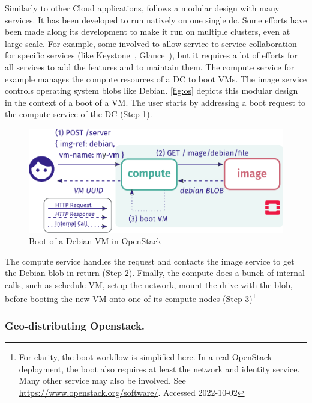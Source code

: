 Similarly to other Cloud applications, \os follows a modular design
with many services.
%
It has been developed to run natively on one single \gls{dc}.
%
Some efforts have been made along its development to make it run on
multiple clusters, even at large scale.
%
For example, some involved to allow service-to-service collaboration
for specific services (like Keystone~\cite{keystonefed},
Glance~\cite{glance-edge}), but it requires a lot of efforts for all
services to add the features and to maintain them.
%
The compute service for example manages the compute resources of a
\acrshort{DC} to boot VMs.
%
The image service controls operating system \acrshort{blob}s like Debian.
\autoref{fig:os} depicts this modular design in the context of a boot
of a VM.
%
The user starts by addressing a boot request to the compute
service of the DC (Step 1).
%
\begin{figure}[h]
  \centering
  \includegraphics[width=.7\linewidth]{figs/pdf/openstack-vmprovision}
  \caption{Boot of a Debian VM in OpenStack}
  \label{fig:os}
\end{figure}
%
The compute service handles the request and contacts the image service
to get the Debian blob in return (Step 2).
%
Finally, the compute does a bunch of internal calls, such as schedule
VM, setup the network, mount the drive with the blob, before booting
the new VM onto one of its compute nodes (Step 3)\footnote{For
clarity, the boot workflow is simplified here. In a real OpenStack
deployment, the boot also requires at least the network and identity
service. Many other service may also be involved.  See
\url{https://www.openstack.org/software/}.  Accessed 2022-10-02}


\subsubsection{Geo-distributing Openstack.}


